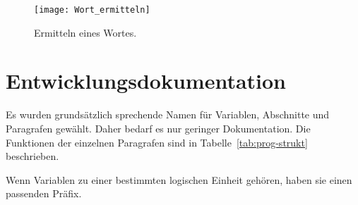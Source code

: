 \begin{figure}[!h]
    \texttt{[image: Wort\_ermitteln]}
    \caption{
        Ermitteln eines Wortes.
    }
    \label{fig:diagramm4}
\end{figure}


\section{Entwicklungsdokumentation}\label{sec:entwicklerdokumentation}


Es wurden grundsätzlich sprechende Namen für Variablen, Abschnitte und Paragrafen gewählt.
Daher bedarf es nur geringer Dokumentation.
Die Funktionen der einzelnen Paragrafen sind in Tabelle~\ref{tab:prog-strukt} beschrieben.

Wenn Variablen zu einer bestimmten logischen Einheit gehören, haben sie einen passenden Präfix.

